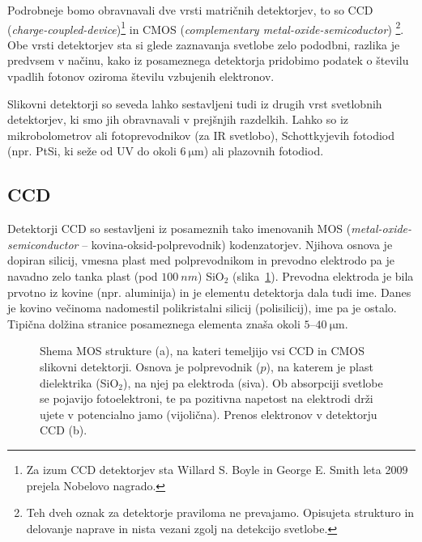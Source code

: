 Podrobneje bomo obravnavali dve vrsti matričnih detektorjev, to so CCD 
({\it charge-coupled-device})\footnote{Za izum CCD detektorjev sta Willard 
S. Boyle in George E. Smith  leta 2009 prejela Nobelovo nagrado.} 
in CMOS ({\it complementary metal-oxide-semicoductor})
\footnote{Teh dveh oznak za detektorje praviloma ne prevajamo. Opisujeta 
strukturo in delovanje naprave in nista vezani zgolj na detekcijo svetlobe.}. Obe vrsti
detektorjev sta si glede zaznavanja svetlobe zelo pododbni, razlika
je predvsem v načinu, kako iz posameznega detektorja pridobimo podatek o številu 
vpadlih fotonov oziroma številu vzbujenih elektronov.

\begin{remark}
Slikovni detektorji so seveda lahko sestavljeni tudi iz drugih vrst svetlobnih detektorjev, 
ki smo jih obravnavali v prejšnjih razdelkih. Lahko so iz mikrobolometrov
ali fotoprevodnikov (za IR svetlobo),
Schottkyjevih fotodiod (npr. PtSi, ki seže od UV do
okoli $6~\si{\micro\meter}$) ali plazovnih fotodiod.
\end{remark}

\subsection*{CCD}
Detektorji CCD so sestavljeni iz posameznih tako imenovanih MOS ({\it metal-oxide-semiconductor}
-- kovina-oksid-polprevodnik) kodenzatorjev. Njihova osnova je dopiran silicij, vmesna 
plast med polprevodnikom in prevodno elektrodo pa je navadno zelo tanka plast (pod $100~\si{nm}$)
SiO$_2$ (slika~\ref{11_MOS}).
Prevodna elektroda je bila prvotno iz kovine (npr. aluminija) in je elementu detektorja dala tudi ime.
Danes je kovino večinoma nadomestil polikristalni silicij (polisilicij), ime pa je ostalo.
Tipična dolžina stranice posameznega elementa znaša okoli $5$--$40~\si{\micro\meter}$. 
\begin{figure}[h!]
\centering
\def\svgwidth{140truemm} 

\caption{Shema MOS strukture (a), na kateri temeljijo vsi CCD in CMOS slikovni detektorji. Osnova je 
polprevodnik ($p$), na katerem je plast dielektrika (SiO$_2$), na njej pa elektroda (siva). 
Ob absorpciji svetlobe se pojavijo fotoelektroni, te pa pozitivna napetost
na elektrodi drži ujete v potencialno jamo (vijolična). Prenos elektronov v detektorju CCD (b).}
\label{11_MOS}
\end{figure}

